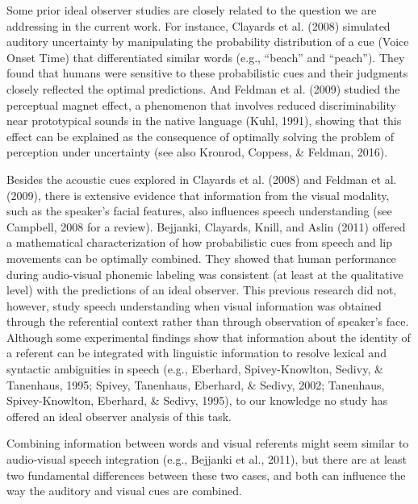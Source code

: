 \documentclass[english,,man,floatsintext]{apa6}
\theoremstyle{definition}
\theoremstyle{definition}
\theoremstyle{definition}
\theoremstyle{remark}
\begin{document}
Some prior ideal observer studies are closely related to the question we
are addressing in the current work. For instance, Clayards et al. (2008)
simulated auditory uncertainty by manipulating the probability
distribution of a cue (Voice Onset Time) that differentiated similar
words (e.g., \enquote{beach} and \enquote{peach}). They found that
humans were sensitive to these probabilistic cues and their judgments
closely reflected the optimal predictions. And Feldman et al. (2009)
studied the perceptual magnet effect, a phenomenon that involves reduced
discriminability near prototypical sounds in the native language (Kuhl,
1991), showing that this effect can be explained as the consequence of
optimally solving the problem of perception under uncertainty (see also
Kronrod, Coppess, \& Feldman, 2016).

Besides the acoustic cues explored in Clayards et al. (2008) and Feldman
et al. (2009), there is extensive evidence that information from the
visual modality, such as the speaker's facial features, also influences
speech understanding (see Campbell, 2008 for a review). Bejjanki,
Clayards, Knill, and Aslin (2011) offered a mathematical
characterization of how probabilistic cues from speech and lip movements
can be optimally combined. They showed that human performance during
audio-visual phonemic labeling was consistent (at least at the
qualitative level) with the predictions of an ideal observer. This
previous research did not, however, study speech understanding when
visual information was obtained through the referential context rather
than through observation of speaker's face. Although some experimental
findings show that information about the identity of a referent can be
integrated with linguistic information to resolve lexical and syntactic
ambiguities in speech (e.g., Eberhard, Spivey-Knowlton, Sedivy, \&
Tanenhaus, 1995; Spivey, Tanenhaus, Eberhard, \& Sedivy, 2002;
Tanenhaus, Spivey-Knowlton, Eberhard, \& Sedivy, 1995), to our knowledge
no study has offered an ideal observer analysis of this task.

Combining information between words and visual referents might seem
similar to audio-visual speech integration (e.g., Bejjanki et al.,
2011), but there are at least two fundamental differences between these
two cases, and both can influence the way the auditory and visual cues
are combined.
\end{document}
